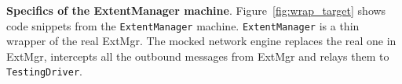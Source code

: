 

\textbf{Specifics of the ExtentManager machine}.
Figure~\ref{fig:wrap_target} shows code snippets from the \texttt{ExtentManager} \psharp machine. \texttt{ExtentManager} is a thin wrapper of the real ExtMgr. The mocked network engine replaces the real one in ExtMgr, intercepts all the outbound messages from ExtMgr and relays them to \texttt{TestingDriver}.



